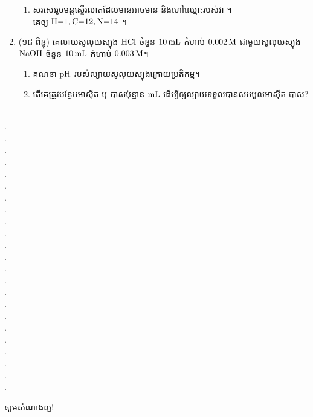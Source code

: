\documentclass{officialexam}
\begin{document}
\begin{enumerate}[I]
\begin{enumerate}[k]
 			\item សរសេររូបមន្តស្ទើរលាតដែលមានអាចមាន និងហៅឈ្មោះរបស់វា ។\\
 			គេឲ្យ $\ce{H=1,C=12,N=14}$ ។
 		\end{enumerate}
 		\item {\color{khtug}(១៨ ពិន្ទុ)} គេលាយសូលុយស្យុង $\ce{HCl}$ ចំនួន $\ce{10 mL}$ កំហាប់ $\ce{0.002M}$ ជាមួយសូលុយស្យុង $\ce{NaOH}$ ចំនួន $\ce{10mL}$ កំហាប់ $\ce{0.003M}$។
 		\begin{enumerate}[k]
 			\item គណនា $\ce{pH}$ របស់ល្យាយសូលុយស្យុងក្រោយប្រតិកម្ម។
 			\item តើគេត្រូវបន្ថែមអាសុីត ឬ បាសប៉ុន្មាន $\ce{mL}$ ដើម្បីឲ្យល្យាយទទួលបានសមមូលអាសុីត-បាស?
 		\end{enumerate}
	\end{enumerate}
\\
{\color{white}.}\dotfill\\
{\color{white}.}\dotfill\\
{\color{white}.}\dotfill
\\
{\color{white}.}\dotfill\\
{\color{white}.}\dotfill\\
{\color{white}.}\dotfill
\\
{\color{white}.}\dotfill\\
{\color{white}.}\dotfill\\
{\color{white}.}\dotfill
\\
{\color{white}.}\dotfill\\
{\color{white}.}\dotfill\\
{\color{white}.}\dotfill
\\
{\color{white}.}\dotfill\\
{\color{white}.}\dotfill\\
{\color{white}.}\dotfill
\\
{\color{white}.}\dotfill\\
{\color{white}.}\dotfill\\
{\color{white}.}\dotfill
\\
{\color{white}.}\dotfill\\
{\color{white}.}\dotfill\\
{\color{white}.}\dotfill
\\
{\color{white}.}\dotfill\\
{\color{white}.}\dotfill\\
\begin{center}
	\sffamily\color{blue}
	សូមសំណាងល្អ!
\end{center}\newpage
\end{document}
